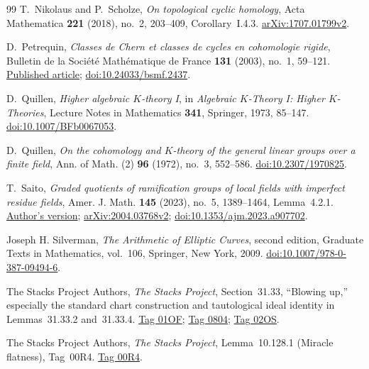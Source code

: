 \documentclass[11pt,a4paper]{amsart}
\numberwithin{equation}{section}
\theoremstyle{definition}
\theoremstyle{remark}
\begin{document}
\begin{thebibliography}{99}
T.~Nikolaus and P.~Scholze, \emph{On topological cyclic homology},
Acta Mathematica \textbf{221} (2018), no.~2, 203--409, Corollary~I.4.3.
\href{https://arxiv.org/abs/1707.01799v2}{arXiv:1707.01799v2}.

D.~Petrequin, \emph{Classes de Chern et classes de cycles en
cohomologie rigide}, Bulletin de la Soci\'et\'e Math\'ematique
de France \textbf{131} (2003), no.~1, 59--121.
\href{https://www.numdam.org/article/BSMF_2003__131_1_59_0.pdf}
{Published article};
\href{https://doi.org/10.24033/bsmf.2437}{doi:10.24033/bsmf.2437}.

D.~Quillen, \emph{Higher algebraic $K$-theory I}, in \emph{Algebraic $K$-Theory I: Higher $K$-Theories}, Lecture Notes in Mathematics \textbf{341}, Springer, 1973, 85--147.
\href{https://doi.org/10.1007/BFb0067053}{doi:10.1007/BFb0067053}.

D.~Quillen, \emph{On the cohomology and \(K\)-theory of the general
linear groups over a finite field}, Ann. of Math. (2)
\textbf{96} (1972), no.~3, 552--586.
\href{https://doi.org/10.2307/1970825}{doi:10.2307/1970825}.

T.~Saito, \emph{Graded quotients of ramification groups of local fields with imperfect residue fields}, Amer. J. Math. \textbf{145} (2023), no.~5, 1389--1464, Lemma~4.2.1.
\href{https://preprint.press.jhu.edu/ajm/sites/default/files/AJM-saito.pdf}{Author's version};
\href{https://arxiv.org/abs/2004.03768v2}{arXiv:2004.03768v2};
\href{https://doi.org/10.1353/ajm.2023.a907702}{doi:10.1353/ajm.2023.a907702}.

Joseph H. Silverman,
\emph{The Arithmetic of Elliptic Curves},
second edition, Graduate Texts in Mathematics, vol.~106,
Springer, New York, 2009.
\href{https://doi.org/10.1007/978-0-387-09494-6}{doi:10.1007/978-0-387-09494-6}.

The Stacks Project Authors, \emph{The Stacks Project}, Section~31.33, ``Blowing up,'' especially the standard chart construction and tautological ideal identity in Lemmas~31.33.2 and~31.33.4.
\href{https://stacks.math.columbia.edu/tag/01OF}{Tag 01OF};
\href{https://stacks.math.columbia.edu/tag/0804}{Tag 0804};
\href{https://stacks.math.columbia.edu/tag/02OS}{Tag 02OS}.

The Stacks Project Authors, \emph{The Stacks Project}, Lemma~10.128.1 (Miracle flatness), Tag~00R4.
\href{https://stacks.math.columbia.edu/tag/00R4}{Tag 00R4}.


\end{thebibliography}
\end{document}
